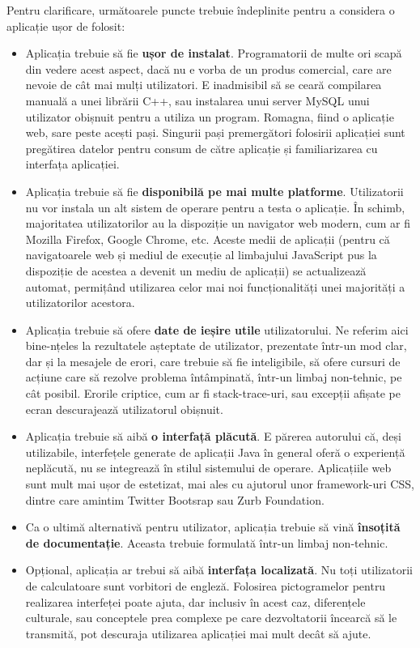 \documentclass[12pt, a4paper, twoside, romanian]{teza-upb}
\begin{document}
      Pentru clarificare, următoarele puncte trebuie îndeplinite pentru a considera o aplicație ușor de folosit:
      \begin{itemize}
      \item Aplicația trebuie să fie \textbf{ușor de instalat}. Programatorii de multe ori scapă din vedere acest aspect, dacă nu e vorba de un produs comercial, care are nevoie de cât mai mulți utilizatori.
        E inadmisibil să se ceară compilarea manuală a unei librării C++, sau instalarea unui server MySQL unui utilizator obișnuit pentru a utiliza un program. Romagna, fiind o aplicație web, sare peste acești pași. Singurii pași premergători folosirii aplicației sunt pregătirea datelor pentru consum de către aplicație și familiarizarea cu interfața aplicației.
      \item Aplicația trebuie să fie \textbf{disponibilă pe mai multe platforme}. Utilizatorii nu vor instala un alt sistem de operare pentru a testa o aplicație. 
        În schimb, majoritatea utilizatorilor au la dispoziție un navigator web modern, cum ar fi Mozilla Firefox, Google Chrome, etc. 
        Aceste medii de aplicații (pentru că navigatoarele web și mediul de execuție al limbajului JavaScript pus la dispoziție de acestea a devenit un mediu de aplicații) se actualizează automat, permițând utilizarea celor mai noi funcționalități unei majorități a utilizatorilor acestora.
        \item Aplicația trebuie să ofere \textbf{date de ieșire utile} utilizatorului. Ne referim aici bine-nțeles la rezultatele așteptate de utilizator, prezentate într-un mod clar, dar și la mesajele de erori, care trebuie să fie inteligibile, să ofere cursuri de acțiune care să rezolve problema întâmpinată, într-un limbaj non-tehnic, pe cât posibil.
          Erorile criptice, cum ar fi stack-trace-uri, sau excepții afișate pe ecran descurajează utilizatorul obișnuit.
        \item Aplicația trebuie să aibă \textbf{o interfață plăcută}. E părerea autorului că, deși utilizabile, interfețele generate de aplicații Java în general oferă o experiență neplăcută, nu se integrează în stilul sistemului de operare. Aplicațiile web sunt mult mai ușor de estetizat, mai ales cu ajutorul unor framework-uri CSS, dintre care amintim Twitter Bootsrap sau Zurb Foundation.
          \item Ca o ultimă alternativă pentru utilizator, aplicația trebuie să vină \textbf{însoțită de documentație}. Aceasta trebuie formulată într-un limbaj non-tehnic.
          \item Opțional, aplicația ar trebui să aibă \textbf{interfața localizată}. Nu toți utilizatorii de calculatoare sunt vorbitori de engleză. Folosirea pictogramelor pentru realizarea interfeței poate ajuta, dar inclusiv în acest caz, diferențele culturale, sau conceptele prea complexe pe care dezvoltatorii încearcă să le transmită, pot descuraja utilizarea aplicației mai mult decât să ajute.
      \end{itemize}
\end{document}
